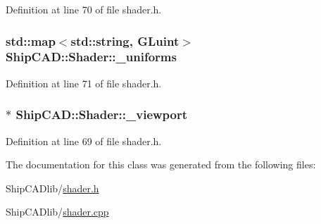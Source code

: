 Definition at line 70 of file shader.\-h.

\hypertarget{classShipCAD_1_1Shader_a5c98e4ae6e3403f179a3fcf204b34baf}{
\subsubsection[{\-\_\-uniforms}]{\setlength{\rightskip}{0pt plus 5cm}std\-::map$<$std\-::string, G\-Luint$>$ Ship\-C\-A\-D\-::\-Shader\-::\-\_\-uniforms\hspace{0.3cm}{\ttfamily [protected]}}}\label{classShipCAD_1_1Shader_a5c98e4ae6e3403f179a3fcf204b34baf}


Definition at line 71 of file shader.\-h.

\hypertarget{classShipCAD_1_1Shader_a0ee19c28f4fd4260b70095ccd433d546}{
\subsubsection[{\-\_\-viewport}]{$\ast$ Ship\-C\-A\-D\-::\-Shader\-::\-\_\-viewport\hspace{0.3cm}{\ttfamily [protected]}}}\label{classShipCAD_1_1Shader_a0ee19c28f4fd4260b70095ccd433d546}


Definition at line 69 of file shader.\-h.



The documentation for this class was generated from the following files\-:\begin{DoxyCompactItemize}
\item 
Ship\-C\-A\-Dlib/\hyperlink{shader_8h}{shader.\-h}\item 
Ship\-C\-A\-Dlib/\hyperlink{shader_8cpp}{shader.\-cpp}\end{DoxyCompactItemize}
